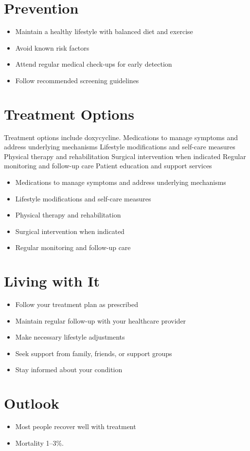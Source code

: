 \section{Prevention}
\begin{itemize}[noitemsep]
  \item Maintain a healthy lifestyle with balanced diet and exercise
  \item Avoid known risk factors
  \item Attend regular medical check-ups for early detection
  \item Follow recommended screening guidelines
\end{itemize}
\section{Treatment Options}
Treatment options include doxycycline. Medications to manage symptoms and address underlying mechanisms Lifestyle modifications and self-care measures Physical therapy and rehabilitation Surgical intervention when indicated Regular monitoring and follow-up care Patient education and support services

\begin{itemize}[noitemsep]
  \item Medications to manage symptoms and address underlying mechanisms
  \item Lifestyle modifications and self-care measures
  \item Physical therapy and rehabilitation
  \item Surgical intervention when indicated
  \item Regular monitoring and follow-up care
\end{itemize}
\section{Living with It}
\begin{itemize}[noitemsep]
  \item Follow your treatment plan as prescribed
  \item Maintain regular follow-up with your healthcare provider
  \item Make necessary lifestyle adjustments
  \item Seek support from family, friends, or support groups
  \item Stay informed about your condition
\end{itemize}
\section{Outlook}
\begin{itemize}[noitemsep]
  \item Most people recover well with treatment
  \item Mortality 1--3\%.
\end{itemize}
